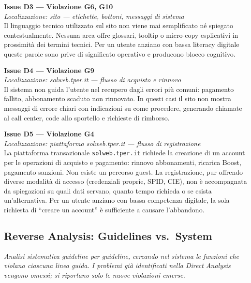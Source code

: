 \documentclass[11pt,a4paper]{article}
\begin{document}
\bigskip

\noindent\textbf{Issue D3 — Violazione G6, G10}\label{iss:D3}\\
\textit{Localizzazione: sito — etichette, bottoni, messaggi di sistema}\\

\noindent Il linguaggio tecnico utilizzato sul sito non viene mai semplificato né spiegato contestualmente. Nessuna area offre glossari, tooltip o micro-copy esplicativi in prossimità dei termini tecnici. Per un utente anziano con bassa literacy digitale queste parole sono prive di significato operativo e producono blocco cognitivo.

\bigskip

\noindent\textbf{Issue D4 — Violazione G9}\label{iss:D4}\\
\textit{Localizzazione: solweb.tper.it --- flusso di acquisto e rinnovo}\\

\noindent Il sistema non guida l'utente nel recupero dagli errori più comuni: pagamento fallito, abbonamento scaduto non rinnovato. In questi casi il sito non mostra messaggi di errore chiari con indicazioni su come procedere, generando chiamate al call center, code allo sportello e richieste di rimborso.

\bigskip

\noindent\textbf{Issue D5 — Violazione G4}\label{iss:D5}\\
\textit{Localizzazione: piattaforma solweb.tper.it --- flusso di
registrazione}\\

\noindent La piattaforma transazionale \texttt{solweb.tper.it} richiede
la creazione di un account per le operazioni di acquisto e
pagamento: rinnovo abbonamenti,
ricarica Boost, pagamento sanzioni. Non esiste un percorso guest. La
registrazione, pur offrendo diverse modalità di accesso (credenziali
proprie, SPID, CIE), non è accompagnata da spiegazioni su quali dati
servano, quanto tempo richieda o se esista un'alternativa. Per un utente
anziano con bassa competenza digitale, la sola richiesta di ``creare un
account'' è sufficiente a causare l'abbandono.

\subsection*{Reverse Analysis: Guidelines vs.\ System}

\noindent\textit{Analisi sistematica guideline per guideline, cercando nel sistema le funzioni che violano ciascuna linea guida. I problemi già identificati nella Direct Analysis vengono omessi; si riportano solo le nuove violazioni emerse.}
\end{document}
